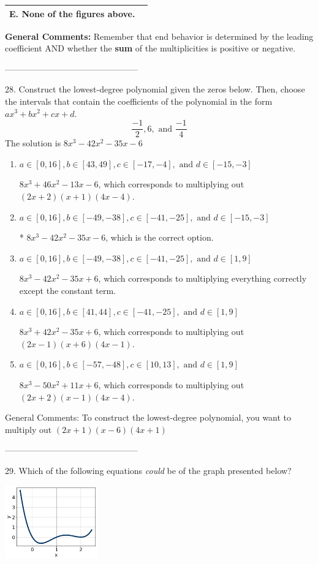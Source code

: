 \documentclass{article}[14pt]
\begin{document}
\begin{tabular}{|c|c|}
\hline 
 E. None of the figures above. & \tabularnewline 
\hline 
 \end{tabular} 
 
\textbf{General Comments:} Remember that end behavior is determined by the leading coefficient AND whether the \textbf{sum} of the multiplicities is positive or negative.

-----------------------------------------------

28. Construct the lowest-degree polynomial given the zeros below. Then, choose the intervals that contain the coefficients of the polynomial in the form $ax^3+bx^2+cx+d$.
$$ \frac{-1}{2}, 6, \text{ and } \frac{-1}{4} $$ 
The solution is $ 8x^{3} -42 x^{2} -35 x -6 $ 

\begin{enumerate}[label=\Alph*.] 
\item $ a \in [0, 16], b \in [43, 49], c \in [-17, -4], \text{ and } d \in [-15, -3] $ 

 $8x^{3} +46 x^{2} -13 x -6$, which corresponds to multiplying out $(2x + 2)(x + 1)(4x -4)$. 
\item $ a \in [0, 16], b \in [-49, -38], c \in [-41, -25], \text{ and } d \in [-15, -3] $ 

 * $8x^{3} -42 x^{2} -35 x -6$, which is the correct option. 
\item $ a \in [0, 16], b \in [-49, -38], c \in [-41, -25], \text{ and } d \in [1, 9] $ 

 $8x^{3} -42 x^{2} -35 x + 6$, which corresponds to multiplying everything correctly except the constant term. 
\item $ a \in [0, 16], b \in [41, 44], c \in [-41, -25], \text{ and } d \in [1, 9] $ 

 $8x^{3} +42 x^{2} -35 x + 6$, which corresponds to multiplying out $(2x -1)(x + 6)(4x -1)$. 
\item $ a \in [0, 16], b \in [-57, -48], c \in [10, 13], \text{ and } d \in [1, 9] $ 

 $8x^{3} -50 x^{2} +11 x + 6$, which corresponds to multiplying out $(2x + 2)(x -1)(4x -4)$. 
\end{enumerate} 
 
General Comments: To construct the lowest-degree polynomial, you want to multiply out $(2x + 1)(x -6)(4x + 1)$

-----------------------------------------------

29. Which of the following equations \textit{could} be of the graph presented below?
\begin{center} \includegraphics[width=0.3\textwidth]{../Figures/polyGraphToFunctionA.png} \end{center} 
\end{document}
